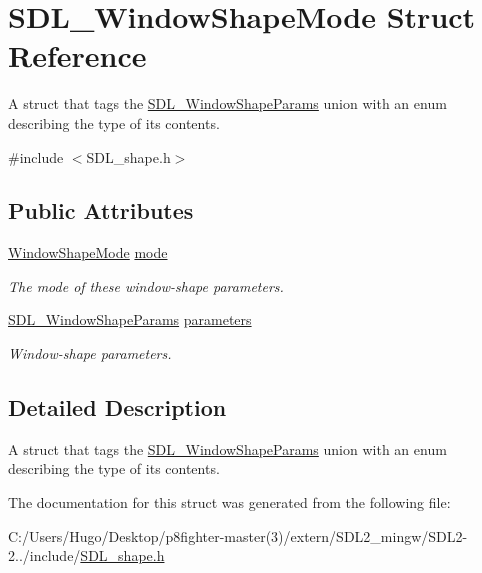 \hypertarget{struct_s_d_l___window_shape_mode}{}\section{S\+D\+L\+\_\+\+Window\+Shape\+Mode Struct Reference}
\label{struct_s_d_l___window_shape_mode}


A struct that tags the \hyperlink{union_s_d_l___window_shape_params}{S\+D\+L\+\_\+\+Window\+Shape\+Params} union with an enum describing the type of its contents.  




{\ttfamily \#include $<$S\+D\+L\+\_\+shape.\+h$>$}

\subsection*{Public Attributes}
\begin{DoxyCompactItemize}
\item 
\mbox{\label{struct_s_d_l___window_shape_mode_a40ebd8b9a76d982cbd87563386cc05de}} 
\hyperlink{_s_d_l__shape_8h_aa30948f2699e316a43b740eccebe5c20}{Window\+Shape\+Mode} \hyperlink{struct_s_d_l___window_shape_mode_a40ebd8b9a76d982cbd87563386cc05de}{mode}
\begin{DoxyCompactList}\small\item\em The mode of these window-\/shape parameters. \end{DoxyCompactList}\item 
\mbox{\label{struct_s_d_l___window_shape_mode_a2f79bb294034156207fa6d88d3a8c819}} 
\hyperlink{union_s_d_l___window_shape_params}{S\+D\+L\+\_\+\+Window\+Shape\+Params} \hyperlink{struct_s_d_l___window_shape_mode_a2f79bb294034156207fa6d88d3a8c819}{parameters}
\begin{DoxyCompactList}\small\item\em Window-\/shape parameters. \end{DoxyCompactList}\end{DoxyCompactItemize}


\subsection{Detailed Description}
A struct that tags the \hyperlink{union_s_d_l___window_shape_params}{S\+D\+L\+\_\+\+Window\+Shape\+Params} union with an enum describing the type of its contents. 

The documentation for this struct was generated from the following file\+:\begin{DoxyCompactItemize}
\item 
C\+:/\+Users/\+Hugo/\+Desktop/p8fighter-\/master(3)/extern/\+S\+D\+L2\+\_\+mingw/\+S\+D\+L2-\/2../include/\hyperlink{_s_d_l__shape_8h}{S\+D\+L\+\_\+shape.\+h}\end{DoxyCompactItemize}
